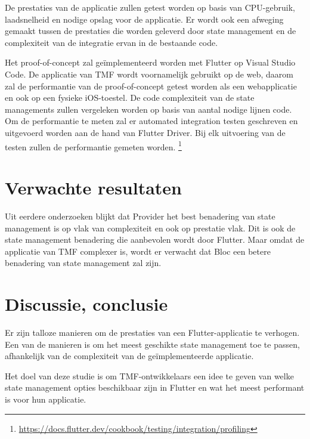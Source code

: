 De prestaties van de applicatie zullen getest worden op basis van CPU-gebruik, laadsnelheid en nodige opslag voor de applicatie. Er wordt ook een afweging gemaakt tussen de prestaties die worden geleverd door state management en de complexiteit van de integratie ervan in de bestaande code.

Het proof-of-concept zal geïmplementeerd worden met Flutter op Visual Studio Code. De applicatie van TMF wordt voornamelijk gebruikt op de web, daarom zal de performantie van de proof-of-concept getest worden als een webapplicatie en ook op een fysieke iOS-toestel. De code complexiteit van de state managements zullen vergeleken worden op basis van aantal nodige lijnen code. 
Om de performantie te meten zal er automated integration testen geschreven en uitgevoerd worden aan de hand van Flutter Driver. Bij elk uitvoering van de testen zullen de performantie gemeten worden. \footnote{\url{https://docs.flutter.dev/cookbook/testing/integration/profiling}}



\section{Verwachte resultaten}%


\label{sec:verwachte-resultaten}
Uit eerdere onderzoeken blijkt dat Provider het best benadering van state management is op vlak van complexiteit en ook op prestatie vlak. Dit is ook de state management benadering die aanbevolen wordt door Flutter. Maar omdat de applicatie van TMF complexer is, wordt er verwacht dat Bloc een betere benadering van state management zal zijn.


\section{Discussie, conclusie}%
\label{sec:discussie-conclusie}
Er zijn talloze manieren om de prestaties van een Flutter-applicatie te verhogen. Een van de manieren is om het meest geschikte state management toe te passen, afhankelijk van de complexiteit van de geïmplementeerde applicatie. 

Het doel van deze studie is om TMF-ontwikkelaars een idee te geven van welke state management opties beschikbaar zijn in Flutter en wat het meest performant is voor hun applicatie. 



